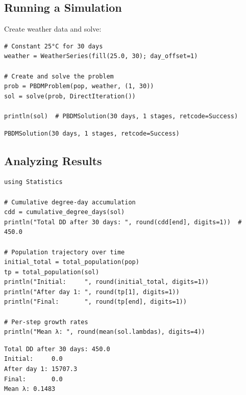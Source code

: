 \subsection{Running a Simulation}



\label{7759732254495466501}{}


Create weather data and solve:




\begin{verbatim}
# Constant 25°C for 30 days
weather = WeatherSeries(fill(25.0, 30); day_offset=1)

# Create and solve the problem
prob = PBDMProblem(pop, weather, (1, 30))
sol = solve(prob, DirectIteration())

println(sol)  # PBDMSolution(30 days, 1 stages, retcode=Success)
\end{verbatim}




\begin{verbatim}
PBDMSolution(30 days, 1 stages, retcode=Success)
\end{verbatim}



\subsection{Analyzing Results}



\label{14503851737432438586}{}



\begin{verbatim}
using Statistics

# Cumulative degree-day accumulation
cdd = cumulative_degree_days(sol)
println("Total DD after 30 days: ", round(cdd[end], digits=1))  # 450.0

# Population trajectory over time
initial_total = total_population(pop)
tp = total_population(sol)
println("Initial:     ", round(initial_total, digits=1))
println("After day 1: ", round(tp[1], digits=1))
println("Final:       ", round(tp[end], digits=1))

# Per-step growth rates
println("Mean λ: ", round(mean(sol.lambdas), digits=4))
\end{verbatim}




\begin{verbatim}
Total DD after 30 days: 450.0
Initial:     0.0
After day 1: 15707.3
Final:       0.0
Mean λ: 0.1483
\end{verbatim}



